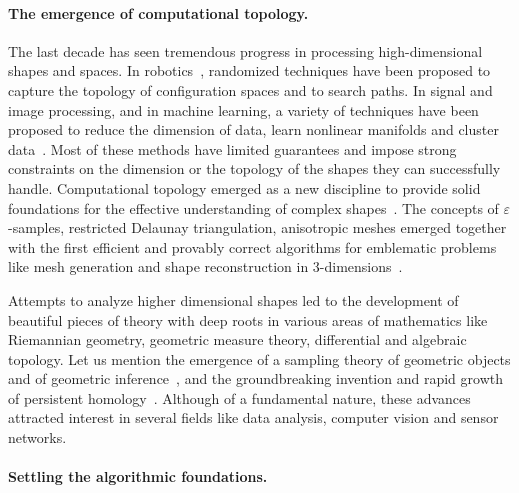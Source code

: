 \paragraph{The emergence of computational topology.}
The last decade has seen tremendous progress in processing high-dimensional shapes and spaces. In robotics~\cite{sml-pa-2006}, randomized techniques have been proposed to capture the topology of configuration spaces and to search paths. In signal and image processing, and in machine learning, a variety of techniques have been proposed to reduce the dimension of data, learn nonlinear manifolds and cluster data~\cite{hs-fmmds-2006}. %
Most  of these methods have limited guarantees and 
impose strong constraints on the dimension or the topology of the shapes they can successfully handle. Computational topology emerged as a new discipline  to 
provide solid foundations for the effective understanding of complex shapes~\cite{hh-ct-2010}. 
The concepts of $\varepsilon$-samples, restricted Delaunay triangulation, anisotropic meshes emerged together with the first efficient and provably correct algorithms for emblematic problems like mesh generation and shape reconstruction in 3-dimensions~\cite{geometrica-ecg-book}. 

Attempts to analyze higher dimensional shapes led to the development of beautiful pieces of theory with deep roots in various areas of mathematics like Riemannian geometry, geometric measure theory, differential and algebraic topology. Let us mention  the emergence of a sampling theory of geometric objects and of geometric inference~\cite{geometrica-ccl09}, and the groundbreaking invention and rapid growth of persistent homology~\cite{eh-ph-2008}.
Although of a fundamental nature, these advances 
attracted  interest in several fields like data analysis, computer vision and sensor networks.

\paragraph{Settling the algorithmic foundations.}


